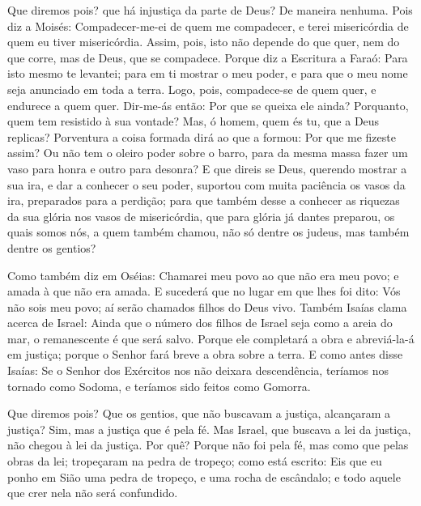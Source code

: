 Que diremos pois? que há injustiça da parte de Deus? De maneira
nenhuma. Pois diz a Moisés: Compadecer-me-ei de quem me
compadecer, e terei misericórdia de quem eu tiver misericórdia.
Assim, pois, isto não depende do que quer, nem do que corre,
mas de Deus, que se compadece. Porque diz a Escritura a
Faraó: Para isto mesmo te levantei; para em ti mostrar o meu poder,
e para que o meu nome seja anunciado em toda a terra. Logo,
pois, compadece-se de quem quer, e endurece a quem quer.
Dir-me-ás então: Por que se queixa ele ainda? Porquanto, quem
tem resistido à sua vontade? Mas, ó homem, quem és tu, que a
Deus replicas? Porventura a coisa formada dirá ao que a formou: Por
que me fizeste assim? Ou não tem o oleiro poder sobre o
barro, para da mesma massa fazer um vaso para honra e outro para
desonra? E que direis se Deus, querendo mostrar a sua ira, e
dar a conhecer o seu poder, suportou com muita paciência os vasos da
ira, preparados para a perdição; para que também desse a
conhecer as riquezas da sua glória nos vasos de misericórdia, que
para glória já dantes preparou, os quais somos nós, a quem
também chamou, não só dentre os judeus, mas também dentre os
gentios?

Como também diz em Oséias: Chamarei meu povo ao que não era meu
povo; e amada à que não era amada. E sucederá que no lugar em
que lhes foi dito: Vós não sois meu povo; aí serão chamados filhos
do Deus vivo. Também Isaías clama acerca de Israel: Ainda que
o número dos filhos de Israel seja como a areia do mar, o
remanescente é que será salvo. Porque ele completará a obra e
abreviá-la-á em justiça; porque o Senhor fará breve a obra sobre a
terra. E como antes disse Isaías: Se o Senhor dos Exércitos
nos não deixara descendência, teríamos nos tornado como Sodoma, e
teríamos sido feitos como Gomorra.

Que diremos pois? Que os gentios, que não buscavam a justiça,
alcançaram a justiça? Sim, mas a justiça que é pela fé. Mas
Israel, que buscava a lei da justiça, não chegou à lei da justiça.
Por quê? Porque não foi pela fé, mas como que pelas obras da
lei; tropeçaram na pedra de tropeço; como está escrito: Eis
que eu ponho em Sião uma pedra de tropeço, e uma rocha de escândalo;
e todo aquele que crer nela não será confundido.

\medskip

